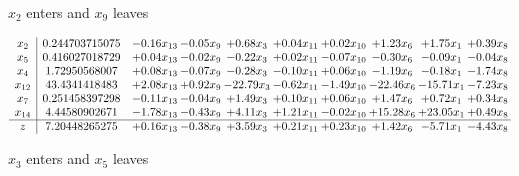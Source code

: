 \documentclass[9pt]{article}
\begin{document}
 $ x_{2} $ enters and $ x_{9} $ leaves 

 \[\begin{array}{c| c c@{\hskip 2pt} c@{\hskip 2pt} c@{\hskip 2pt} c@{\hskip 2pt} c@{\hskip 2pt} c@{\hskip 2pt} c@{\hskip 2pt} c@{\hskip 2pt} }
 x_{2}   &  0.244703715075 & -0.16 x_{13} & -0.05 x_{9} & +  0.68 x_{3} & +  0.04 x_{11} & +  0.02 x_{10} & +  1.23 x_{6} & +  1.75 x_{1} & +  0.39 x_{8}\\
 x_{5}   &  0.416027018729 & +  0.04 x_{13} & -0.02 x_{9} & -0.22 x_{3} & +  0.02 x_{11} & -0.07 x_{10} & -0.30 x_{6} & -0.09 x_{1} & -0.04 x_{8}\\
 x_{4}   &  1.72950568007 & +  0.08 x_{13} & -0.07 x_{9} & -0.28 x_{3} & -0.10 x_{11} & +  0.06 x_{10} & -1.19 x_{6} & -0.18 x_{1} & -1.74 x_{8}\\
 x_{12}   &  43.4341418483 & +  2.08 x_{13} & +  0.92 x_{9} & -22.79 x_{3} & -0.62 x_{11} & -1.49 x_{10} & -22.46 x_{6} & -15.71 x_{1} & -7.23 x_{8}\\
 x_{7}   &  0.251458397298 & -0.11 x_{13} & -0.04 x_{9} & +  1.49 x_{3} & +  0.10 x_{11} & +  0.06 x_{10} & +  1.47 x_{6} & +  0.72 x_{1} & +  0.34 x_{8}\\
 x_{14}   &  4.44580902671 & -1.78 x_{13} & -0.43 x_{9} & +  4.11 x_{3} & +  1.21 x_{11} & -0.02 x_{10} & + 15.28 x_{6} & + 23.05 x_{1} & +  0.49 x_{8}\\
\hline
z    &  7.20448265275 & +  0.16 x_{13} & -0.38 x_{9} & +  3.59 x_{3} & +  0.21 x_{11} & +  0.23 x_{10} & +  1.42 x_{6} & -5.71 x_{1} & -4.43 x_{8}\\
\end{array}\]


 $ x_{3} $ enters and $ x_{5} $ leaves 
\end{document}
